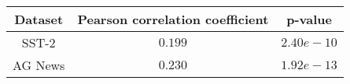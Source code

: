 \begin{tabular}{ccc}
\toprule
    Dataset & Pearson correlation coefficient & p-value \\
    \midrule 
     SST-2 & $0.199$ & $2.40e-10$ \\ 
     \cmidrule{2-3}
     AG News & $0.230$ & $1.92e-13$  \\ 
    \bottomrule
\end{tabular}